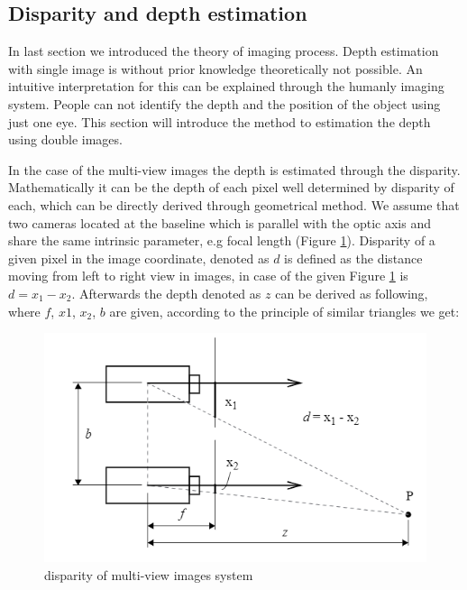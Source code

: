 \subsection{Disparity and depth estimation}
\label{disparity and depth estimation}

In last section we introduced the theory of imaging process. Depth estimation with single image is without prior knowledge theoretically not possible. An intuitive interpretation for this can be explained through the humanly imaging system. People can not identify the depth and the position of the object using just one eye. This section will introduce the method to estimation the depth using double images. 

In the case of the multi-view images the depth is estimated through the disparity. Mathematically it can be the depth of each pixel well determined by disparity of each, which can be directly derived through geometrical method. We assume that two cameras located at the baseline which is parallel with the optic axis and share the same intrinsic parameter, e.g focal length (Figure \ref{fig:disparity}). Disparity of a given pixel in the image coordinate, denoted as $d$ is defined as the distance moving from left to right view in images, in case of the given Figure  \ref{fig:disparity} is $d=x_1-x_2$. 
Afterwards the depth denoted as $z$ can be derived as following,
where $f$, $x1$, $x_2$, $b$ are given, according to the principle of similar triangles we get:

\begin{figure}
\centering
\includegraphics[width=15cm]{images/disparity.PNG}
\caption{disparity of multi-view images system}
\label{fig:disparity}
\end{figure}

